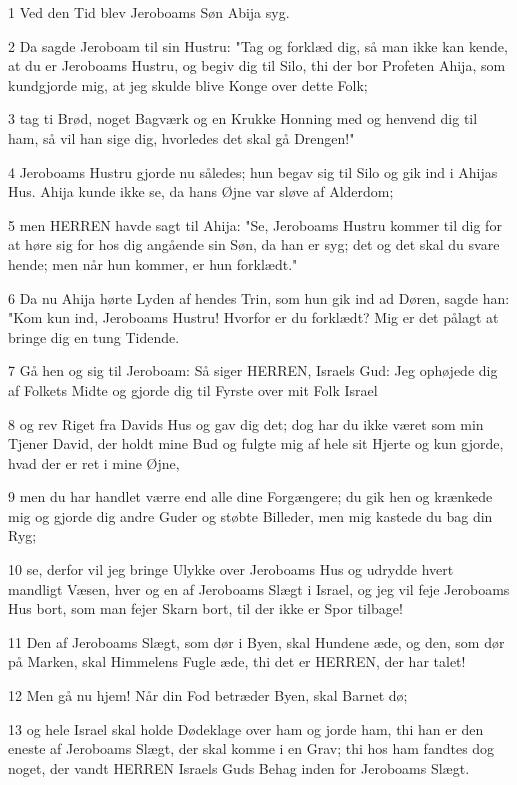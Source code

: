 \par 1 Ved den Tid blev Jeroboams Søn Abija syg.
\par 2 Da sagde Jeroboam til sin Hustru: "Tag og forklæd dig, så man ikke kan kende, at du er Jeroboams Hustru, og begiv dig til Silo, thi der bor Profeten Ahija, som kundgjorde mig, at jeg skulde blive Konge over dette Folk;
\par 3 tag ti Brød, noget Bagværk og en Krukke Honning med og henvend dig til ham, så vil han sige dig, hvorledes det skal gå Drengen!"
\par 4 Jeroboams Hustru gjorde nu således; hun begav sig til Silo og gik ind i Ahijas Hus. Ahija kunde ikke se, da hans Øjne var sløve af Alderdom;
\par 5 men HERREN havde sagt til Ahija: "Se, Jeroboams Hustru kommer til dig for at høre sig for hos dig angående sin Søn, da han er syg; det og det skal du svare hende; men når hun kommer, er hun forklædt."
\par 6 Da nu Ahija hørte Lyden af hendes Trin, som hun gik ind ad Døren, sagde han: "Kom kun ind, Jeroboams Hustru! Hvorfor er du forklædt? Mig er det pålagt at bringe dig en tung Tidende.
\par 7 Gå hen og sig til Jeroboam: Så siger HERREN, Israels Gud: Jeg ophøjede dig af Folkets Midte og gjorde dig til Fyrste over mit Folk Israel
\par 8 og rev Riget fra Davids Hus og gav dig det; dog har du ikke været som min Tjener David, der holdt mine Bud og fulgte mig af hele sit Hjerte og kun gjorde, hvad der er ret i mine Øjne,
\par 9 men du har handlet værre end alle dine Forgængere; du gik hen og krænkede mig og gjorde dig andre Guder og støbte Billeder, men mig kastede du bag din Ryg;
\par 10 se, derfor vil jeg bringe Ulykke over Jeroboams Hus og udrydde hvert mandligt Væsen, hver og en af Jeroboams Slægt i Israel, og jeg vil feje Jeroboams Hus bort, som man fejer Skarn bort, til der ikke er Spor tilbage!
\par 11 Den af Jeroboams Slægt, som dør i Byen, skal Hundene æde, og den, som dør på Marken, skal Himmelens Fugle æde, thi det er HERREN, der har talet!
\par 12 Men gå nu hjem! Når din Fod betræder Byen, skal Barnet dø;
\par 13 og hele Israel skal holde Dødeklage over ham og jorde ham, thi han er den eneste af Jeroboams Slægt, der skal komme i en Grav; thi hos ham fandtes dog noget, der vandt HERREN Israels Guds Behag inden for Jeroboams Slægt.
